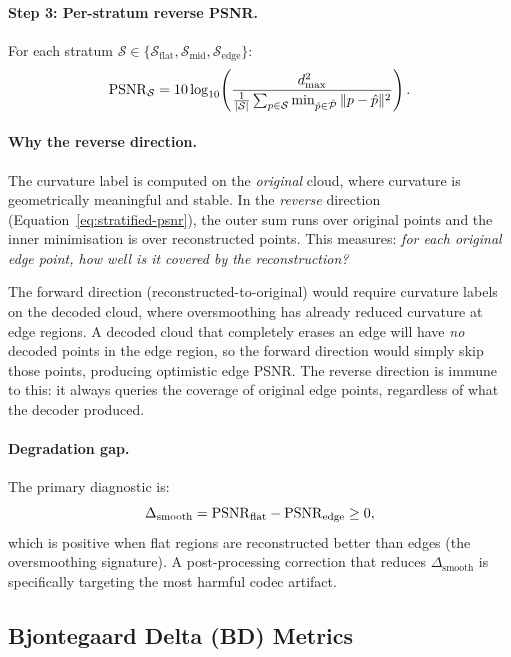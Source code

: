 \paragraph{Step 3: Per-stratum reverse PSNR.}
For each stratum $\mathcal{S} \in \{\mathcal{S}_{\text{flat}}, \mathcal{S}_{\text{mid}}, \mathcal{S}_{\text{edge}}\}$:
\begin{equation}
  \mathrm{PSNR}_{\mathcal{S}} = 10\log_{10}\!\left(
    \frac{d_{\max}^2}{\frac{1}{|\mathcal{S}|}\sum_{p \in \mathcal{S}}
      \min_{\hat{p} \in \hat{\mathcal{P}}} \|p - \hat{p}\|^2}
  \right).
  \label{eq:stratified-psnr}
\end{equation}

\paragraph{Why the reverse direction.}
The curvature label is computed on the \emph{original} cloud, where curvature
is geometrically meaningful and stable.
In the \emph{reverse} direction (Equation~\ref{eq:stratified-psnr}),
the outer sum runs over original points and the inner minimisation is over
reconstructed points.
This measures: \textit{for each original edge point, how well is it covered
by the reconstruction?}

The forward direction (reconstructed-to-original) would require curvature
labels on the decoded cloud, where oversmoothing has already reduced curvature
at edge regions.
A decoded cloud that completely erases an edge will have \emph{no} decoded
points in the edge region, so the forward direction would simply skip those
points, producing optimistic edge PSNR.
The reverse direction is immune to this: it always queries the coverage of
original edge points, regardless of what the decoder produced.

\paragraph{Degradation gap.}
The primary diagnostic is:
\begin{equation}
  \Delta_{\text{smooth}} = \mathrm{PSNR}_{\text{flat}} - \mathrm{PSNR}_{\text{edge}} \geq 0,
\end{equation}
which is positive when flat regions are reconstructed better than edges
(the oversmoothing signature).
A post-processing correction that reduces $\Delta_{\text{smooth}}$ is
specifically targeting the most harmful codec artifact.

\subsection{Bjontegaard Delta (BD) Metrics}
\label{ssec:bd}

